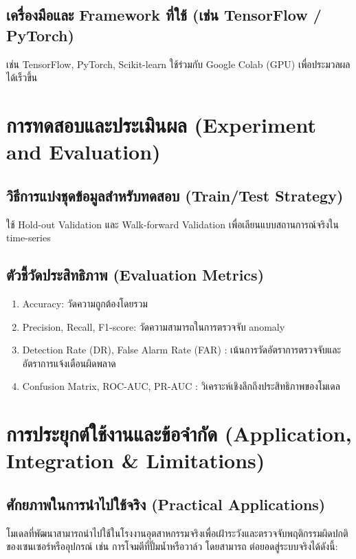 \subsection{เครื่องมือและ Framework ที่ใช้ (เช่น TensorFlow / PyTorch)}
\hspace{2em} เช่น TensorFlow, PyTorch, Scikit-learn ใช้ร่วมกับ Google Colab (GPU) เพื่อประมวลผลได้เร็วขึ้น

\section{การทดสอบและประเมินผล (Experiment and Evaluation)}

\subsection{วิธีการแบ่งชุดข้อมูลสำหรับทดสอบ (Train/Test Strategy)}
\hspace{2em} ใช้ Hold-out Validation และ Walk-forward Validation เพื่อเลียนแบบสถานการณ์จริงใน time-series

\subsection{ตัวชี้วัดประสิทธิภาพ (Evaluation Metrics)}
\begin{enumerate}
  \item Accuracy: วัดความถูกต้องโดยรวม
  \item Precision, Recall, F1-score: วัดความสามารถในการตรวจจับ anomaly
  \item Detection Rate (DR), False Alarm Rate (FAR) : เน้นการวัดอัตราการตรวจจับและอัตราการแจ้งเตือนผิดพลาด
  \item Confusion Matrix, ROC-AUC, PR-AUC : วิเคราะห์เชิงลึกถึงประสิทธิภาพของโมเดล
\end{enumerate}

\section{การประยุกต์ใช้งานและข้อจำกัด (Application, Integration \& Limitations)}

\subsection{ ศักยภาพในการนำไปใช้จริง (Practical Applications)}
\hspace{2em} โมเดลที่พัฒนาสามารถนำไปใช้ในโรงงานอุตสาหกรรมจริงเพื่อเฝ้าระวังและตรวจจับพฤติกรรมผิดปกติของเซนเซอร์หรืออุปกรณ์ เช่น การโจมตีที่ปั๊มน้ำหรือวาล์ว โดยสามารถ ต่อยอดสู่ระบบจริงได้ดังนี้:


